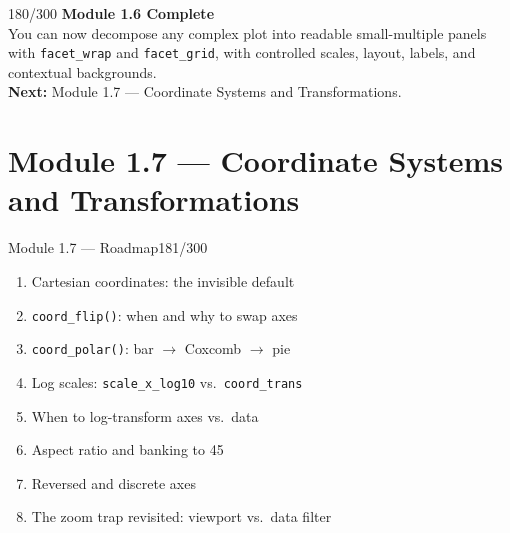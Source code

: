 \documentclass[10pt]{beamer}
\newcommand{\smark}[1]{\hfill{\scriptsize\color{codegray}#1}}
\begin{document}
\begin{frame}{}\smark{180/300}
\centering\vspace{1.5cm}
{\Large\textbf{Module 1.6 Complete}}\\[0.5cm]
You can now decompose any complex plot into readable small-multiple panels with \texttt{facet\_wrap} and \texttt{facet\_grid}, with controlled scales, layout, labels, and contextual backgrounds.\\[0.5cm]
\textbf{Next:} Module 1.7 --- Coordinate Systems and Transformations.
\end{frame}

\section{Module 1.7 --- Coordinate Systems and Transformations}

\begin{frame}{Module 1.7 --- Roadmap}\smark{181/300}
\begin{enumerate}
    \item Cartesian coordinates: the invisible default
    \item \texttt{coord\_flip()}: when and why to swap axes
    \item \texttt{coord\_polar()}: bar $\to$ Coxcomb $\to$ pie
    \item Log scales: \texttt{scale\_x\_log10} vs.\ \texttt{coord\_trans}
    \item When to log-transform axes vs.\ data
    \item Aspect ratio and banking to 45\textdegree
    \item Reversed and discrete axes
    \item The zoom trap revisited: viewport vs.\ data filter
\end{enumerate}
\end{frame}
\end{document}
